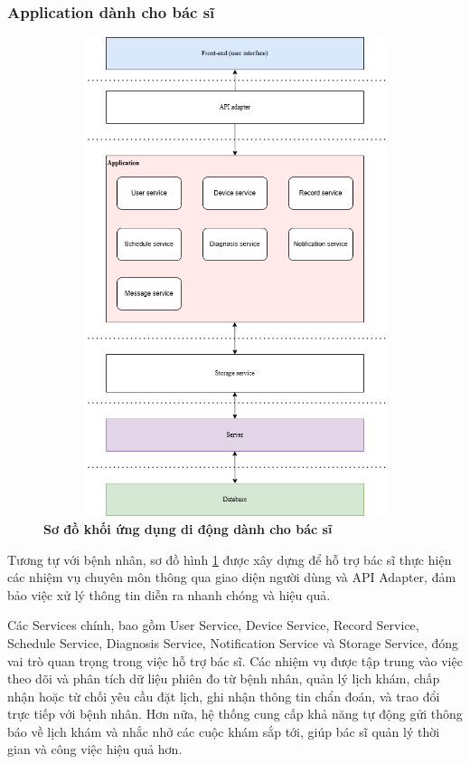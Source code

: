 \subsubsection{Application dành cho bác sĩ}
\begin{figure}[H]
  \centering
  \includegraphics[width=12cm,height=14cm]{Images/System/fmECG_architecture-Doctors.drawio.png}
  \caption[Sơ đồ khối application dành cho bác sĩ]{\bfseries \fontsize{12pt}{0pt}\selectfont Sơ đồ khối ứng dụng di động dành cho bác sĩ}
  \label{fmECG_architecture-Doctor} %
\end{figure}
Tương tự với bệnh nhân, sơ đồ hình \ref{fmECG_architecture-Doctor} được xây dựng để hỗ trợ bác sĩ thực hiện các nhiệm vụ chuyên môn thông qua giao diện người dùng và API Adapter, đảm bảo việc xử lý thông tin diễn ra nhanh chóng và hiệu quả.

Các Services chính, bao gồm User Service, Device Service, Record Service, Schedule Service, Diagnosis Service, Notification Service và Storage Service, đóng vai trò quan trọng trong việc hỗ trợ bác sĩ.
Các nhiệm vụ được tập trung vào việc theo dõi và phân tích dữ liệu phiên đo từ bệnh nhân, quản lý lịch khám, chấp nhận hoặc từ chối yêu cầu đặt lịch, ghi nhận thông tin chẩn đoán, và trao đổi trực tiếp với bệnh nhân.
Hơn nữa, hệ thống cung cấp khả năng tự động gửi thông báo về lịch khám và nhắc nhở các cuộc khám sắp tới, giúp bác sĩ quản lý thời gian và công việc hiệu quả hơn.

